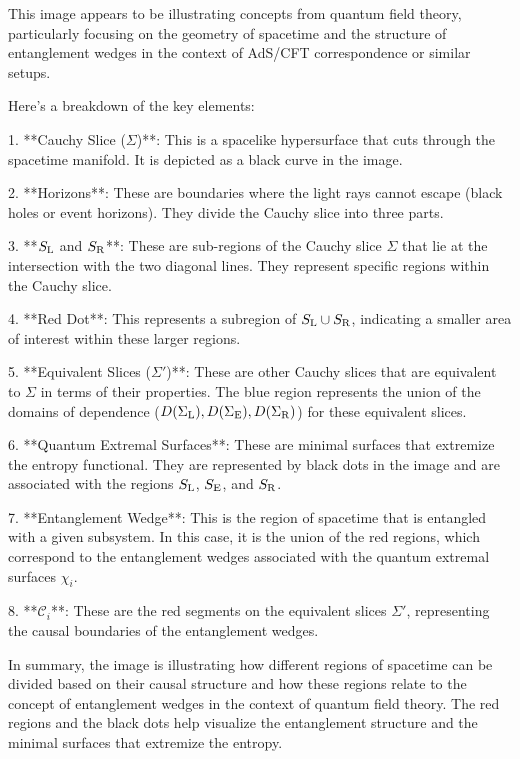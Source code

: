 This image appears to be illustrating concepts from quantum field theory, particularly focusing on the geometry of spacetime and the structure of entanglement wedges in the context of AdS/CFT correspondence or similar setups.

Here's a breakdown of the key elements:

1. **Cauchy Slice (\(\Sigma\))**: This is a spacelike hypersurface that cuts through the spacetime manifold. It is depicted as a black curve in the image.

2. **Horizons**: These are boundaries where the light rays cannot escape (black holes or event horizons). They divide the Cauchy slice into three parts.

3. **\(S_{\rm L}\) and \(S_{\rm R}\)**: These are sub-regions of the Cauchy slice \(\Sigma\) that lie at the intersection with the two diagonal lines. They represent specific regions within the Cauchy slice.

4. **Red Dot**: This represents a subregion of \(S_{\rm L} \cup S_{\rm R}\), indicating a smaller area of interest within these larger regions.

5. **Equivalent Slices (\(\Sigma'\))**: These are other Cauchy slices that are equivalent to \(\Sigma\) in terms of their properties. The blue region represents the union of the domains of dependence (\(D(\Sigma_{\rm L}), D(\Sigma_{\rm E}), D(\Sigma_{\rm R})\)) for these equivalent slices.

6. **Quantum Extremal Surfaces**: These are minimal surfaces that extremize the entropy functional. They are represented by black dots in the image and are associated with the regions \(S_{\rm L}\), \(S_{\rm E}\), and \(S_{\rm R}\).

7. **Entanglement Wedge**: This is the region of spacetime that is entangled with a given subsystem. In this case, it is the union of the red regions, which correspond to the entanglement wedges associated with the quantum extremal surfaces \(\chi_i\).

8. **\(\mathcal{C}_i\)**: These are the red segments on the equivalent slices \(\Sigma'\), representing the causal boundaries of the entanglement wedges.

In summary, the image is illustrating how different regions of spacetime can be divided based on their causal structure and how these regions relate to the concept of entanglement wedges in the context of quantum field theory. The red regions and the black dots help visualize the entanglement structure and the minimal surfaces that extremize the entropy.